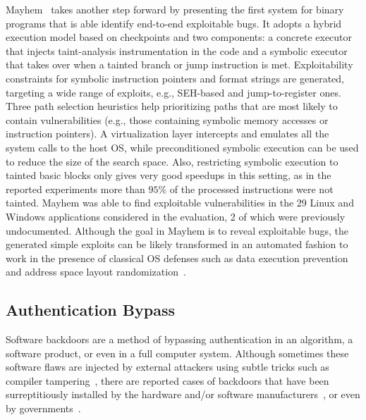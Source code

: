 {\sc Mayhem}~\cite{MAYHEM-SP12} takes another step forward by presenting the first system for binary programs that is able identify end-to-end exploitable bugs. It adopts a hybrid execution model based on checkpoints and two components: a concrete executor that injects taint-analysis instrumentation in the code and a symbolic executor that takes over when a tainted branch or jump instruction is met. Exploitability constraints for symbolic instruction pointers and format strings are generated, targeting a wide range of exploits, e.g., SEH-based and jump-to-register ones. Three path selection heuristics help prioritizing paths that are most likely to contain vulnerabilities (e.g., those containing symbolic memory accesses or instruction pointers). A virtualization layer intercepts and emulates all the system calls to the host OS, while preconditioned symbolic execution can be used to reduce the size of the search space. Also, restricting symbolic execution to tainted basic blocks only gives very good speedups in this setting, as in the reported experiments more than $95\%$ of the processed instructions were not tainted. {\sc Mayhem} was able to find exploitable vulnerabilities in the 29 Linux and Windows applications considered in the evaluation, 2 of which were previously undocumented. Although the goal in {\sc Mayhem} is to reveal exploitable bugs, the generated simple exploits can be likely transformed in an automated fashion to work in the presence of classical OS defenses such as data execution prevention and address space layout randomization~\cite{Q-SEC11}. 

\vspace{-1mm} %
\subsection{Authentication Bypass}
\label{ss:auth-bypass}
Software backdoors are a method of bypassing authentication in an algorithm, a software product, or even in a full computer system. Although sometimes these software flaws are injected by external attackers using subtle tricks such as compiler tampering~\cite{KRS-TR74}, there are reported cases of backdoors that have been surreptitiously installed by the hardware and/or software manufacturers~\cite{CZF-USEC14}, or even by governments~\cite{NSA-BACKDOOR}. 

